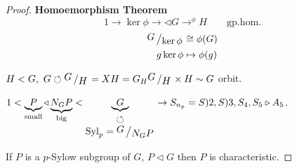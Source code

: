 \documentclass{article}
\newcommand{\quotient}[2]{{\raisebox{.2em}{$#1$}\left/\raisebox{-.2em}{$#2$}\right.}}
\newcommand{\tsubgp}{\triangleleft}
\newcommand{\tsupgp}{\triangleright}
\theoremstyle{definition}
\theoremstyle{remark}
\theoremstyle{example}
\begin{document}
\begin{proof}
		\textbf{Homoemorphism Theorem}
		\[ 1 \to \ker \phi \to{\tsubgp} G \to^\phi H \qquad \mathrm{gp. hom.} \]
		\begin{align*}
			\quotient{G}{\ker \phi} & \cong \phi(G)\\
			g \ker \phi &\mapsto \phi(g)
		\end{align*}
		
		$H<G,\ G \circlearrowleft \quotient{G}{H}=X\\
		H=G_H\\
		\quotient{G}{H} \times H \sim G$ orbit.
		
		$1 < \underbrace{P}_\mathrm{small} \tsubgp \underbrace{N_GP}_\mathrm{big} < \underbrace{G}_{\begin{matrix}
			\circlearrowleft\\
			\mathrm{Syl}_p = \quotient{G}{N_GP}
			\end{matrix}} \to S_{n_p}=S)2,S)3,S_4,S_5 \tsupgp A_5$.
		
		If $P$ is a $p$-Sylow subgroup of $G$, $P \tsubgp G$ then $P$ is characteristic.
	\end{proof}
	
	
	
\end{document}
